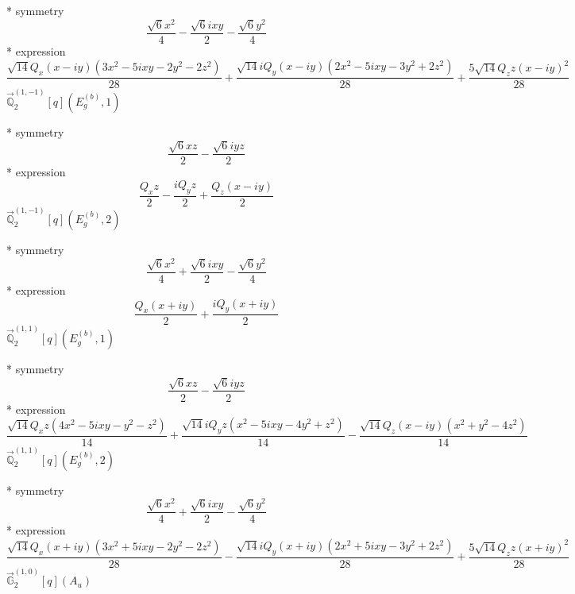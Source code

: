 \documentclass[fleqn,8pt]{jsarticle}
\begin{document}
\noindent\quad ** symmetry
\begin{dmath*}
\frac{\sqrt{6} x^{2}}{4} - \frac{\sqrt{6} i x y}{2} - \frac{\sqrt{6} y^{2}}{4}
\end{dmath*}
\noindent\quad ** expression
\begin{dmath*}
\frac{\sqrt{14} Q_{x} \left(x - i y\right) \left(3 x^{2} - 5 i x y - 2 y^{2} - 2 z^{2}\right)}{28} + \frac{\sqrt{14} i Q_{y} \left(x - i y\right) \left(2 x^{2} - 5 i x y - 3 y^{2} + 2 z^{2}\right)}{28} + \frac{5 \sqrt{14} Q_{z} z \left(x - i y\right)^{2}}{28}
\end{dmath*}
\noindent\quad $\vec{\mathbb{Q}}_{2}^{(1,-1)}[q](E_{g}^{(b)},1)$

\noindent\quad ** symmetry
\begin{dmath*}
\frac{\sqrt{6} x z}{2} - \frac{\sqrt{6} i y z}{2}
\end{dmath*}
\noindent\quad ** expression
\begin{dmath*}
\frac{Q_{x} z}{2} - \frac{i Q_{y} z}{2} + \frac{Q_{z} \left(x - i y\right)}{2}
\end{dmath*}
\noindent\quad $\vec{\mathbb{Q}}_{2}^{(1,-1)}[q](E_{g}^{(b)},2)$

\noindent\quad ** symmetry
\begin{dmath*}
\frac{\sqrt{6} x^{2}}{4} + \frac{\sqrt{6} i x y}{2} - \frac{\sqrt{6} y^{2}}{4}
\end{dmath*}
\noindent\quad ** expression
\begin{dmath*}
\frac{Q_{x} \left(x + i y\right)}{2} + \frac{i Q_{y} \left(x + i y\right)}{2}
\end{dmath*}
\noindent\quad $\vec{\mathbb{Q}}_{2}^{(1,1)}[q](E_{g}^{(b)},1)$

\noindent\quad ** symmetry
\begin{dmath*}
\frac{\sqrt{6} x z}{2} - \frac{\sqrt{6} i y z}{2}
\end{dmath*}
\noindent\quad ** expression
\begin{dmath*}
\frac{\sqrt{14} Q_{x} z \left(4 x^{2} - 5 i x y - y^{2} - z^{2}\right)}{14} + \frac{\sqrt{14} i Q_{y} z \left(x^{2} - 5 i x y - 4 y^{2} + z^{2}\right)}{14} - \frac{\sqrt{14} Q_{z} \left(x - i y\right) \left(x^{2} + y^{2} - 4 z^{2}\right)}{14}
\end{dmath*}
\noindent\quad $\vec{\mathbb{Q}}_{2}^{(1,1)}[q](E_{g}^{(b)},2)$

\noindent\quad ** symmetry
\begin{dmath*}
\frac{\sqrt{6} x^{2}}{4} + \frac{\sqrt{6} i x y}{2} - \frac{\sqrt{6} y^{2}}{4}
\end{dmath*}
\noindent\quad ** expression
\begin{dmath*}
\frac{\sqrt{14} Q_{x} \left(x + i y\right) \left(3 x^{2} + 5 i x y - 2 y^{2} - 2 z^{2}\right)}{28} - \frac{\sqrt{14} i Q_{y} \left(x + i y\right) \left(2 x^{2} + 5 i x y - 3 y^{2} + 2 z^{2}\right)}{28} + \frac{5 \sqrt{14} Q_{z} z \left(x + i y\right)^{2}}{28}
\end{dmath*}
\noindent\quad $\vec{\mathbb{G}}_{2}^{(1,0)}[q](A_{u})$
\end{document}
